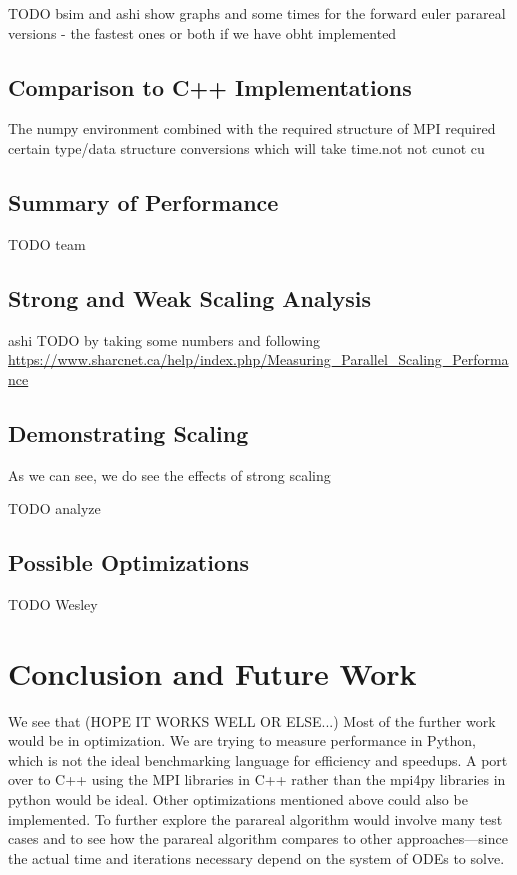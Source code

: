 \documentclass[letterpaper,11pt]{article}
\begin{document}
TODO bsim and ashi show graphs and some times for the forward euler parareal versions - the fastest ones or both if we have obht implemented

\subsection{Comparison to C++ Implementations}

The numpy environment combined with the required structure of MPI required
certain type/data structure conversions which will take time.not not cunot
cu

\subsection{Summary of Performance}

TODO team

\subsection{Strong and Weak Scaling Analysis}

ashi TODO by taking some numbers and following
\url{https://www.sharcnet.ca/help/index.php/Measuring_Parallel_Scaling_Performance}

\subsection{Demonstrating Scaling}

As we can see, we do see the effects of strong scaling

TODO analyze

\subsection{Possible Optimizations}

TODO Wesley

\section{Conclusion and Future Work}

We see that (HOPE IT WORKS WELL OR ELSE...) Most of the further work would be in
optimization. We are trying to measure performance in Python, which is not the
ideal benchmarking language for efficiency and speedups. A port over to C++
using the MPI libraries in C++ rather than the mpi4py libraries in python would
be ideal. Other optimizations mentioned above could also be implemented. To
further explore the parareal algorithm would involve many test cases and to see
how the parareal algorithm compares to other approaches---since the actual time
and iterations necessary depend on the system of ODEs to solve.
\end{document}
